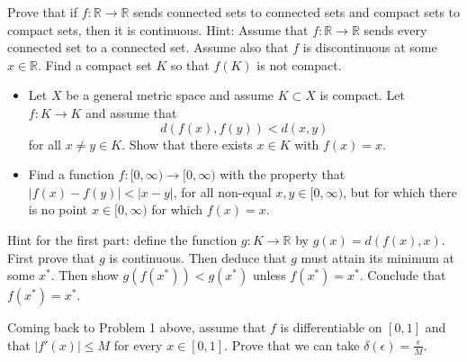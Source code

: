   \begin{exercise}
    Prove that if $f : \mathbb{R} \to \mathbb{R}$ sends connected sets to connected sets and compact sets to compact sets, then it is continuous. Hint: Assume that $f : \mathbb{R} \to \mathbb{R}$ sends every connected set to a connected set. Assume also that $f$ is discontinuous at some $x \in \mathbb{R}$. Find a compact set $K$ so that $f(K)$ is not compact.
  \end{exercise}
  \begin{solution}

  \end{solution}

  \begin{exercise}
    \begin{itemize}
      \item Let $X$ be a general metric space and assume $K \subset X$ is compact. Let $f : K \to K$ and assume that
      \begin{equation}
        d(f(x), f(y)) < d(x, y)
      \end{equation}
      for all $x \neq y \in K$. Show that there exists $x \in K$ with $f(x) = x$.
      
      \item Find a function $f : [0, \infty) \to [0, \infty)$ with the property that $|f(x) - f(y)| < |x - y|$, for all non-equal $x, y \in [0, \infty)$, but for which there is no point $x \in [0, \infty)$ for which $f(x) = x$.
    \end{itemize}
    
    Hint for the first part: define the function $g : K \to \mathbb{R}$ by $g(x) = d(f(x), x)$. First prove that $g$ is continuous. Then deduce that $g$ must attain its minimum at some $x^*$. Then show $g(f(x^*)) < g(x^*)$ unless $f(x^*) = x^*$. Conclude that $f(x^*) = x^*$.
  \end{exercise}
  \begin{solution}

  \end{solution}

  \begin{exercise}
    Coming back to Problem 1 above, assume that $f$ is differentiable on $[0, 1]$ and that $|f'(x)| \leq M$ for every $x \in [0, 1]$. Prove that we can take $\delta(\epsilon) = \frac{\epsilon}{M}$.
  \end{exercise}
  \begin{solution}

  \end{solution}

